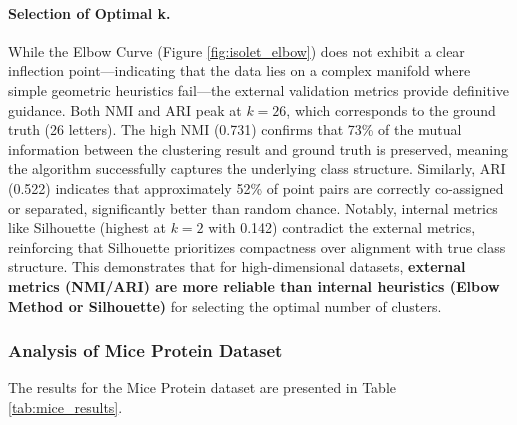 \documentclass[12pt]{article}
\begin{document}
\paragraph{Selection of Optimal k.} While the Elbow Curve (Figure \ref{fig:isolet_elbow}) does not exhibit a clear inflection point—indicating that the data lies on a complex manifold where simple geometric heuristics fail—the external validation metrics provide definitive guidance. Both NMI and ARI peak at $k=26$, which corresponds to the ground truth (26 letters). The high NMI (0.731) confirms that 73\% of the mutual information between the clustering result and ground truth is preserved, meaning the algorithm successfully captures the underlying class structure. Similarly, ARI (0.522) indicates that approximately 52\% of point pairs are correctly co-assigned or separated, significantly better than random chance. Notably, internal metrics like Silhouette (highest at $k=2$ with 0.142) contradict the external metrics, reinforcing that Silhouette prioritizes compactness over alignment with true class structure. This demonstrates that for high-dimensional datasets, \textbf{external metrics (NMI/ARI) are more reliable than internal heuristics (Elbow Method or Silhouette)} for selecting the optimal number of clusters.

\subsubsection{Analysis of Mice Protein Dataset}
The results for the Mice Protein dataset are presented in Table \ref{tab:mice_results}.

\begin{table}[H]
\centering
{}
\caption{Clustering performance for Mice Protein dataset.}
\label{tab:mice_results}
\end{table}
\end{document}
